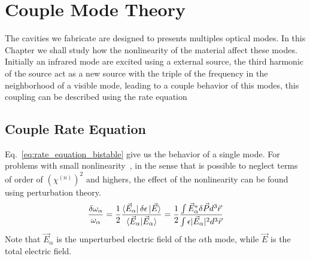 \chapter{Couple Mode Theory}
\label{chap:5_couple_mode}

The cavities we fabricate are designed to presents multiples optical modes. In this Chapter we shall study how the nonlinearity of the material affect these modes. Initially an infrared mode are excited using a external source, the third harmonic of the source act as a new source with the triple of the frequency in the neighborhood of a visible mode, leading to a couple behavior of this modes, this coupling can be described using the rate equation  

\section{Couple Rate Equation}
%
%

Eq.~\ref{eq:rate_equation_bistable} give us the behavior of a single mode. For problems with small nonlinearity~\cite{Rodriguz2007}, in the sense that is possible to neglect terms of order of $\left(\chi^{(n)}\right)^2$ and highers, the effect of the nonlinearity can be found using perturbation theory. 
\begin{equation}
    \frac{\delta\omega_\alpha}{\omega_\alpha} = \frac{1}{2}\frac{\bra{\vec{E}_\alpha}\delta\epsilon\ket{\vec{E}}}{\braket{\vec{E}_\alpha|\vec{E}_\alpha}} = \frac{1}{2}\frac{\int\vec{E}^*_\alpha\delta\vec{P}d^3\vec{r}}{\int \epsilon|\vec{E}_\alpha|^2d^3\vec{r}}
    \label{eq:perp_theory}
\end{equation}
Note that $\vec{E}_\alpha$ is the unperturbed electric field of the $\alpha$th mode, while $\vec{E}$ is the total electric field. 

